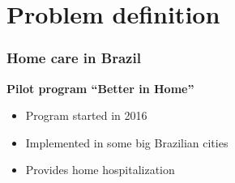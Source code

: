 \section{Problem definition}

\begin{frame}[plain]
   \sectionpage
\end{frame}

\begin{frame}
   \frametitle{Home care in Brazil}

   \textbf{Pilot program ``Better in Home''}
   \begin{itemize}
      \item Program started in 2016
      \item Implemented in some big Brazilian cities
      \item Provides home hospitalization
   \end{itemize}


\end{frame}

